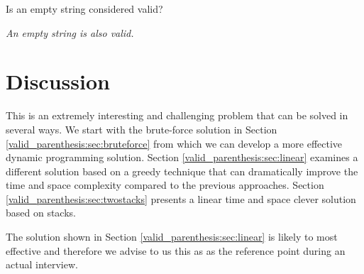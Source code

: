 \begin{QandA}
	\item \begin{questionitem} \begin{question} Is an empty string considered valid?  \end{question} 	 
    \begin{answered}
		\textit{An empty string is also valid.}
	\end{answered} \end{questionitem}
	
\end{QandA}

\section{Discussion}
\label{valid_parenthesis:sec:discussion}
This is an extremely interesting and challenging problem that can be solved in several ways. We start with the brute-force solution in Section \ref{valid_parenthesis:sec:bruteforce} from which we can develop a more effective dynamic programming solution.  
Section \ref{valid_parenthesis:sec:linear} examines a different solution based on a greedy technique that can dramatically improve the time and space complexity compared to the previous approaches. Section \ref{valid_parenthesis:sec:twostacks} presents a linear time and space clever solution based on stacks.

The solution shown in Section \ref{valid_parenthesis:sec:linear} is likely to most effective and therefore we advise to us this as as the reference point during an actual interview.

